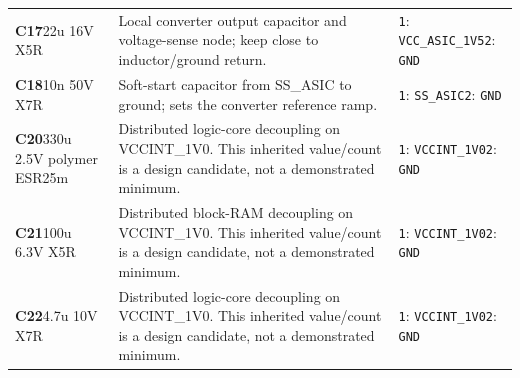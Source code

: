 \documentclass[11pt,a4paper]{article}
\begin{document}
\begin{longtable}{@{}P{27mm}P{84mm}P{57mm}@{}}
\textbf{C17}\newline 22u 16V X5R & Local converter output capacitor and voltage-sense node; keep close to inductor/ground return. & \nolinkurl{1}: \nolinkurl{VCC_ASIC_1V5}\newline \nolinkurl{2}: \nolinkurl{GND} \\
\textbf{C18}\newline 10n 50V X7R & Soft-start capacitor from SS\_ASIC to ground; sets the converter reference ramp. & \nolinkurl{1}: \nolinkurl{SS_ASIC}\newline \nolinkurl{2}: \nolinkurl{GND} \\
\textbf{C20}\newline 330u 2.5V polymer ESR25m & Distributed logic-core decoupling on VCCINT\_1V0. This inherited value/count is a design candidate, not a demonstrated minimum. & \nolinkurl{1}: \nolinkurl{VCCINT_1V0}\newline \nolinkurl{2}: \nolinkurl{GND} \\
\textbf{C21}\newline 100u 6.3V X5R & Distributed block-RAM decoupling on VCCINT\_1V0. This inherited value/count is a design candidate, not a demonstrated minimum. & \nolinkurl{1}: \nolinkurl{VCCINT_1V0}\newline \nolinkurl{2}: \nolinkurl{GND} \\
\textbf{C22}\newline 4.7u 10V X7R & Distributed logic-core decoupling on VCCINT\_1V0. This inherited value/count is a design candidate, not a demonstrated minimum. & \nolinkurl{1}: \nolinkurl{VCCINT_1V0}\newline \nolinkurl{2}: \nolinkurl{GND} \\

\end{longtable}
\end{document}
